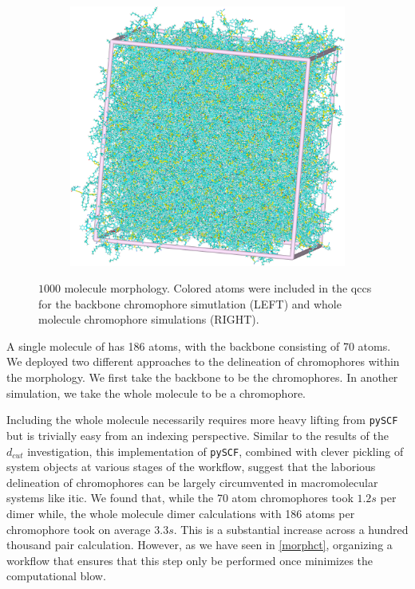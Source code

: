 \begin{figure}
\begin{subfigure}{.5\textwidth}
    \includegraphics[width=\textwidth]{figures/ITIC-unwrapped.png}
\end{subfigure}
    \caption{$1000$ molecule  morphology. Colored atoms were included in the
    \gls{qcc}s for the backbone chromophore simutlation (LEFT) and whole molecule chromophore simulations
    (RIGHT).}
\label{ITIC}
\end{figure}

A single molecule of  has 186 atoms, with the backbone consisting of 70 atoms. We deployed two different
approaches to the delineation of chromophores within the  morphology. 
We first take the backbone to be the chromophores. In another simulation, we
take the whole molecule to be a chromophore. 

Including the whole molecule necessarily requires more heavy lifting from \texttt{pySCF} but is trivially easy from an indexing perspective.
Similar to the results of the $d_{cut}$ investigation, 
this implementation of \texttt{pySCF}, combined with clever pickling of system objects at various stages
of the workflow, suggest that the laborious delineation of chromophores can be
largely circumvented in macromolecular systems like \gls{itic}.
We found that, while the 70 atom chromophores took $1.2s$ 
per dimer while, the whole molecule dimer calculations with 186 atoms per
chromophore took on average $3.3s$. This is a substantial increase across a
hundred thousand pair calculation. However, as we have seen in
\autoref{morphct}, organizing a workflow that ensures that this step only be
performed once minimizes the computational blow.

